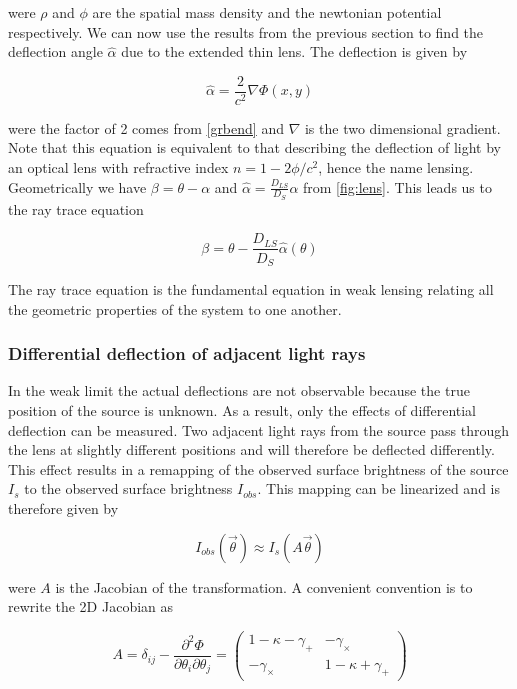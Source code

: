 were $\rho$ and $\phi$ are the spatial mass density and the newtonian potential respectively. We can now use the results from the previous section to find the deflection angle $\hat{\alpha}$ due to the extended thin lens. The deflection is given by

\begin{equation}
  \hat{\alpha} = \frac{2}{c^2} \nabla \Phi(x,y)
  \label{eq:deflectionthinlens}
\end{equation}

were the factor of 2 comes from \autoref{grbend} and $\nabla$ is the two dimensional gradient. Note that this equation is equivalent to that describing the deflection of light by an optical lens with refractive index $n=1-2\phi/c^2$, hence the name lensing. Geometrically we have $\beta = \theta - \alpha$ and $\hat{\alpha} = \frac{D_{LS}}{D_S}\alpha$ from \autoref{fig:lens}. This leads us to the ray trace equation

\begin{equation}
  \beta = \theta - \frac{D_{LS}}{D_S} \hat{\alpha}(\theta)
  \label{eq:raytrace}
\end{equation}

The ray trace equation is the fundamental equation in weak lensing relating all the geometric properties of the system to one another. 

\subsubsection{Differential deflection of adjacent light rays}
In the weak limit the actual deflections are not observable because the true position of the source is unknown. As a result, only the effects of differential deflection can be measured. Two adjacent light rays from the source pass through the lens at slightly different positions and will therefore be deflected differently. This effect results in a remapping of the observed surface brightness of the source $I_s$ to the observed surface brightness $I_{obs}$. This mapping can be linearized and is therefore given by 

\begin{equation}
  I_{obs}(\vec{\theta}) \approx I_s(A\vec{\theta})
  \label{eq:linearizedbright}
\end{equation}

were $A$ is the Jacobian of the transformation. A convenient convention is to rewrite the 2D Jacobian as 

\begin{equation}
  A = \delta_{ij} - \frac{\partial^2 \Phi}{\partial \theta_i \partial \theta_j} =  \begin{pmatrix}
    1-\kappa-\gamma_+ & -\gamma_\times \\
    -\gamma_\times & 1-\kappa+\gamma_+
    \end{pmatrix}
  \label{eq:Ajacobian}
\end{equation}

